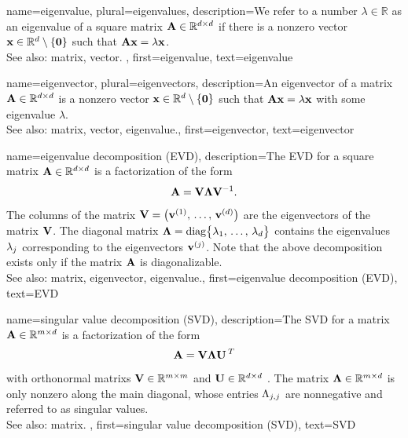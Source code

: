 {name={eigenvalue}, plural={eigenvalues}, 
	description={We refer to a 
		number $\lambda \in \mathbb{R}$ as an eigenvalue of a square \gls{matrix} $\mathbf{A} \in \mathbb{R}^{d \times d}$ 
		if there is a nonzero \gls{vector} ${\bf x} \in \mathbb{R}^{d} \setminus \{ \mathbf{0} \}$ such that $\mathbf{A} {\bf x} = \lambda {\bf x}$.
		\\
		See also: \gls{matrix}, \gls{vector}. },
	first={eigenvalue},
	text={eigenvalue} 
}
	
{name={eigenvector}, plural={eigenvectors}, 
	description={An 
		eigenvector of a \gls{matrix} $\mathbf{A} \in \mathbb{R}^{d \times d}$ 
		is a nonzero \gls{vector} ${\bf x} \in \mathbb{R}^{d} \setminus \{ \mathbf{0} \}$ 
		such that $\mathbf{A} {\bf x} = \lambda {\bf x}$ with some \gls{eigenvalue} $\lambda$.
				\\
		See also: \gls{matrix}, \gls{vector}, \gls{eigenvalue}.},
	first={eigenvector},
	text={eigenvector} 
}

{name={eigenvalue decomposition (EVD)}, 
	description={The EVD
		for a square \gls{matrix} ${\bf A} \in \mathbb{R}^{d \times d}$ 
		is a factorization of the form 
		$${\bf A} = \mathbf{V} {\bm \Lambda} \mathbf{V}^{-1}.$$ 
		The columns of the \gls{matrix} $\mathbf{V} = \big( {\bf v}^{(1)}, \,\ldots, \,{\bf v}^{(d)} \big)$ are the 
		\glspl{eigenvector} of the \gls{matrix} $\mathbf{V}$. The diagonal \gls{matrix} 
		${\bm \Lambda} = {\rm diag} \big\{ \lambda_{1}, \,\ldots, \,\lambda_{d} \big\}$ 
		contains the \glspl{eigenvalue} $\lambda_{j}$ corresponding to the \glspl{eigenvector} ${\bf v}^{(j)}$. 
		Note that the above decomposition exists only if the \gls{matrix} ${\bf A}$ is diagonalizable.
				\\
		See also: \gls{matrix}, \gls{eigenvector}, \gls{eigenvalue}.},
	first={eigenvalue decomposition (EVD)},
	text={EVD} 
}

{name={singular value decomposition (SVD)}, 
  	description={The SVD  
  		for a \gls{matrix} ${\bf A} \in \mathbb{R}^{m \times d}$ 
		is a factorization of the form 
		$${\bf A} = \mathbf{V} {\bm \Lambda} \mathbf{U}\,^{T}$$ 
		with orthonormal \glspl{matrix} $\mathbf{V} \in \mathbb{R}^{m \times m}$ 
		and $\mathbf{U} \in \mathbb{R}^{d \times d}$ \cite{GolubVanLoanBook}. 
		The \gls{matrix} ${\bm \Lambda} \in \mathbb{R}^{m \times d}$ is 
		only nonzero along the main diagonal, whose entries $\Lambda_{j,j}$ 
		are nonnegative and referred to as singular values.
		\\
		See also: \gls{matrix}. },
	first={singular value decomposition (SVD)},
	text={SVD} 
}


